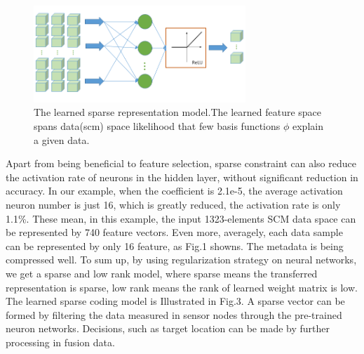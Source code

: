 
\begin{figure}
\includegraphics[width=8cm]{figure/sparse_represention_model}
\caption{The learned sparse representation model.The learned feature space spans data(scm) space likelihood that few basis functions $\phi$ explain a given data.}
\end{figure}

Apart from being beneficial to feature selection, sparse constraint can also reduce the activation rate of neurons in the hidden layer, without significant reduction in accuracy. In our example, when the coefficient is 2.1e-5, the average activation neuron number is just 16, which is greatly reduced, the activation rate is only 1.1{\%}.
These mean, in this example, the input 1323-elements SCM  data space can be represented by 740 feature vectors. Even more, averagely, each data sample can be represented by only 16 feature, as Fig.1 showns. The metadata is being compressed well. To sum up, by using regularization strategy on neural networks, we get a sparse and low rank model, where sparse means the transferred representation is sparse, low rank means the rank of learned weight matrix is low. The learned sparse coding model is Illustrated in Fig.3.
A sparse vector can be formed by filtering the data measured in sensor nodes through the pre-trained neuron networks. Decisions, such as target location can be made by further processing in fusion data.

